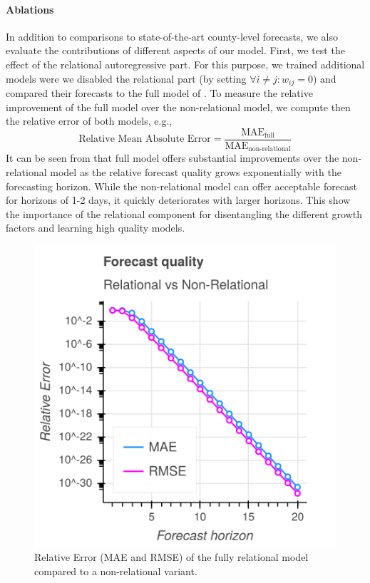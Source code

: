 \paragraph{Ablations} In addition to comparisons to state-of-the-art
county-level forecasts, we also evaluate the contributions of different aspects
of our model. First, we test the effect of the relational autoregressive part.
For this purpose, we trained additional models were we disabled the relational
part (by setting \(\forall i \neq j: w_{ij} = 0\)) and compared their forecasts to
the full model of . To measure the relative improvement of the
full model over the non-relational model, we compute then the relative error of
both models, e.g.,
\begin{equation*}
    \text{Relative Mean Absolute Error} = \frac{\text{MAE}_{\text{full}}}{\text{MAE}_\text{non-relational}}
\end{equation*}
It can be seen from  that full model offers substantial
improvements over the non-relational model as the relative forecast quality
grows exponentially with the forecasting horizon. While the non-relational model
can offer acceptable forecast for horizons of 1-2 days, it quickly deteriorates
with larger horizons. This show the importance of the relational component for
disentangling the different growth factors and learning high quality models.

\begin{figure}[tb]
\centering
\includegraphics[width=.7\linewidth]{img/quality_ratio.png}
\caption{\label{fig:quality-ratio}Relative Error (MAE and RMSE) of the fully relational \bAR model compared to a non-relational variant.}
\end{figure}


